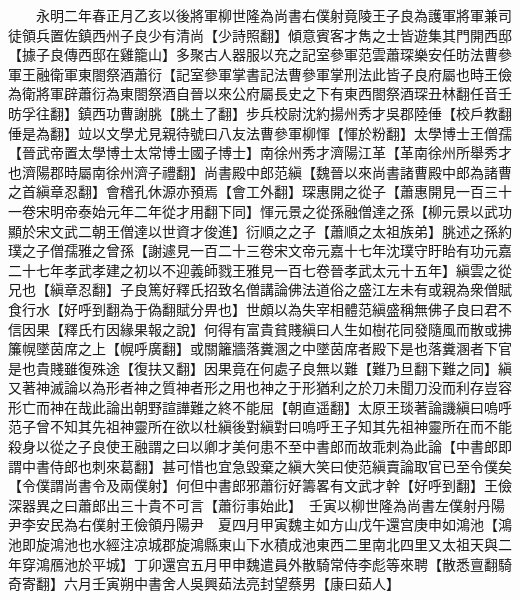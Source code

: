 　　永明二年春正月乙亥以後將軍柳世隆為尚書右僕射竟陵王子良為護軍將軍兼司徒領兵置佐鎮西州子良少有清尚【少詩照翻】傾意賓客才雋之士皆遊集其門開西邸【據子良傳西邸在雞籠山】多聚古人器服以充之記室參軍范雲蕭琛樂安任昉法曹參軍王融衛軍東閤祭酒蕭衍【記室參軍掌書記法曹參軍掌刑法此皆子良府屬也時王儉為衛將軍辟蕭衍為東閤祭酒自晉以來公府屬長史之下有東西閤祭酒琛丑林翻任音壬昉孚往翻】鎮西功曹謝朓【朓土了翻】步兵校尉沈約揚州秀才吳郡陸倕【校戶教翻倕是為翻】竝以文學尤見親待號曰八友法曹參軍柳惲【惲於粉翻】太學博士王僧孺【晉武帝置太學博士太常博士國子博士】南徐州秀才濟陽江革【革南徐州所舉秀才也濟陽郡時屬南徐州濟子禮翻】尚書殿中郎范縝【魏晉以來尚書諸曹殿中郎為諸曹之首縝章忍翻】會稽孔休源亦預焉【會工外翻】琛惠開之從子【蕭惠開見一百三十一卷宋明帝泰始元年二年從才用翻下同】惲元景之從孫融僧達之孫【柳元景以武功顯於宋文武二朝王僧達以世資才俊進】衍順之之子【蕭順之太祖族弟】朓述之孫約璞之子僧孺雅之曾孫【謝遽見一百二十三卷宋文帝元嘉十七年沈璞守盱眙有功元嘉二十七年孝武孝建之初以不迎義師戮王雅見一百七卷晉孝武太元十五年】縝雲之從兄也【縝章忍翻】子良篤好釋氏招致名僧講論佛法道俗之盛江左未有或親為衆僧賦食行水【好呼到翻為于偽翻賦分畀也】世頗以為失宰相體范縝盛稱無佛子良曰君不信因果【釋氏冇因緣果報之說】何得有富貴貧賤縝曰人生如樹花同發隨風而散或拂簾幌墜茵席之上【幌呼廣翻】或關籬牆落糞溷之中墜茵席者殿下是也落糞溷者下官是也貴賤雖復殊途【復扶又翻】因果竟在何處子良無以難【難乃旦翻下難之同】縝又著神滅論以為形者神之質神者形之用也神之于形猶利之於刀未聞刀没而利存豈容形亡而神在哉此論出朝野諠譁難之終不能屈【朝直遥翻】太原王琰著論譏縝曰嗚呼范子曾不知其先祖神靈所在欲以杜縝後對縝對曰嗚呼王子知其先祖神靈所在而不能殺身以從之子良使王融謂之曰以卿才美何患不至中書郎而故乖刺為此論【中書郎即謂中書侍郎也刺來葛翻】甚可惜也宜急毀棄之縝大笑曰使范縝賣論取官已至令僕矣【令僕謂尚書令及兩僕射】何但中書郎邪蕭衍好籌畧有文武才幹【好呼到翻】王儉深器異之曰蕭郎出三十貴不可言【蕭衍事始此】　壬寅以柳世隆為尚書左僕射丹陽尹李安民為右僕射王儉領丹陽尹　夏四月甲寅魏主如方山戊午還宫庚申如鴻池【鴻池即旋鴻池也水經注凉城郡旋鴻縣東山下水積成池東西二里南北四里又太祖天與二年穿鴻鴈池於平城】丁卯還宫五月甲申魏遣員外散騎常侍李彪等來聘【散悉亶翻騎奇寄翻】六月壬寅朔中書舍人吳興茹法亮封望蔡男【康曰茹人】

